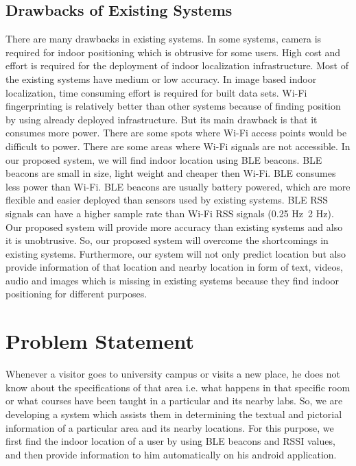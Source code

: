 \documentclass{article}
\begin{document}
\subsection{Drawbacks of Existing Systems}
There are many drawbacks in existing systems. In some systems, camera is required for indoor positioning which is obtrusive for some users. High cost and effort is required for the deployment of indoor localization infrastructure. Most of the existing systems have medium or low accuracy. In image based indoor localization, time consuming effort is required for built data sets. Wi-Fi fingerprinting is relatively better than other systems because of finding position by using already deployed infrastructure. But its main drawback is that it consumes more power. There are some spots where Wi-Fi access points would be difficult to power. There are some areas where Wi-Fi signals are not accessible. In our proposed system, we will find indoor location using BLE beacons. BLE beacons are small in size, light weight and cheaper then Wi-Fi. BLE consumes less power than Wi-Fi. BLE beacons are usually battery powered, which are more flexible and easier deployed than sensors used by existing systems. BLE RSS signals can have a higher sample rate than Wi-Fi RSS signals (0.25 Hz~2 Hz). Our proposed system will provide more accuracy than existing systems and also it is unobtrusive. So, our proposed system will overcome the shortcomings in existing systems. Furthermore, our system will not only predict location but also provide information of that location and nearby location in form of text, videos, audio and images which is missing in existing systems because they find indoor positioning for different purposes\cite{zhuang2016smartphone}.

\section{Problem Statement}
Whenever a visitor goes to university campus or visits a new place, he does not know about the specifications of that area i.e. what happens in that specific room or what courses have been taught in a particular and its nearby labs. So, we are developing a system which assists them in determining the textual and pictorial information of a particular area and its nearby locations. For this purpose, we first find the indoor location of a user by using BLE beacons and RSSI values, and then provide information to him automatically on his android application. 
\end{document}
